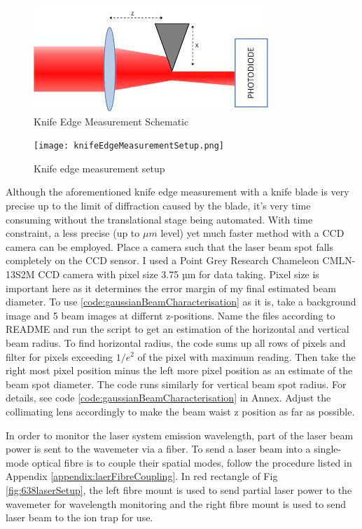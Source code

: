 \documentclass[12pt]{report}
\begin{document}
\begin{figure}[H]
    \centering
    \includegraphics[width=.6\textwidth]{knifeEdgeMeasurement.jpeg}
    \caption{Knife Edge Measurement Schematic}
    \label{fig:knifeEdgeMeasurement}
\end{figure}

\begin{figure}[H]
    \centering
    \texttt{[image: knifeEdgeMeasurementSetup.png]}
    \caption{Knife edge measurement setup}
    \label{fig:knifeEdgeMeasurementSetup}
\end{figure}

Although the aforementioned knife edge measurement with a knife blade is very precise up to the limit of diffraction caused by the blade, it's very time consuming without the translational stage being automated. With time constraint, a less precise (up to $\mu m$ level) yet much faster method with a CCD camera can be employed. Place a camera such that the laser beam spot falls completely on the CCD sensor.  I used a Point Grey Research Chameleon CMLN-13S2M CCD camera with pixel size 3.75 µm for data taking. Pixel size is important here as it determines the error margin of my final estimated beam diameter. To use \ref{code:gaussianBeamCharacterisation} as it is, take a background image and 5 beam images at differnt z-positions. Name the files according to README and run the script to get an estimation of the horizontal and vertical beam radius. To find horizontal radius, the code sums up all rows of pixels and filter for pixels exceeding $1/e^2$ of the pixel with maximum reading. Then take the right most pixel position minus the left more pixel position as an estimate of the beam spot diameter. The code runs similarly for vertical beam spot radius. For details, see code \ref{code:gaussianBeamCharacterisation} in Annex. Adjust the collimating lens accordingly to make the beam waist z position as far as possible. 
\par
In order to monitor the laser system emission wavelength, part of the laser beam power is sent to the wavemeter via a fiber. To send a laser beam into a single-mode optical fibre is to couple their spatial modes, follow the procedure listed in Appendix \ref{appendix:laerFibreCoupling}. In red rectangle of Fig \ref{fig:638laserSetup}, the left fibre mount is used to send partial laser power to the wavemeter for wavelength monitoring and the right fibre mount is used to send laser beam to the ion trap for use. 
\end{document}
